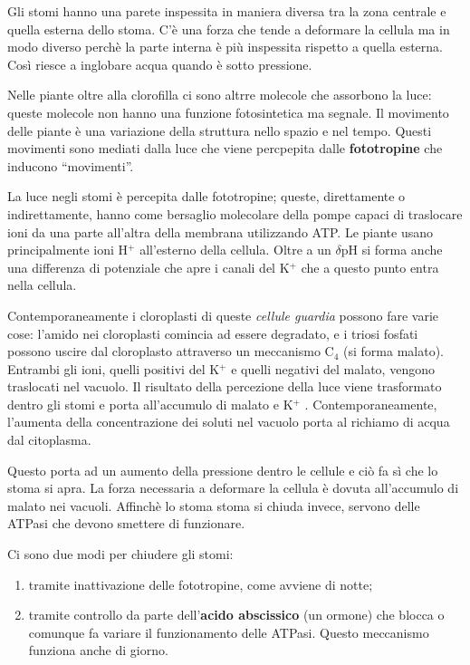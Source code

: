 \documentclass[]{article}
\begin{document}
Gli stomi hanno una parete inspessita in maniera diversa tra la zona
centrale e quella esterna dello stoma. C'è una forza che tende a
deformare la cellula ma in modo diverso perchè la parte interna è più
inspessita rispetto a quella esterna. Così riesce a inglobare acqua
quando è sotto pressione.

Nelle piante oltre alla clorofilla ci sono altrre molecole che assorbono
la luce: queste molecole non hanno una funzione fotosintetica ma
segnale. Il movimento delle piante è una variazione della struttura
nello spazio e nel tempo. Questi movimenti sono mediati dalla luce che
viene percpepita dalle \textbf{fototropine} che inducono ``movimenti''.

La luce negli stomi è percepita dalle fototropine; queste, direttamente
o indirettamente, hanno come bersaglio molecolare della pompe capaci di
traslocare ioni da una parte all'altra della membrana utilizzando ATP.
Le piante usano principalmente ioni H$^+$ all'esterno della cellula.
Oltre a un $\delta$pH si forma anche una differenza di potenziale che
apre i canali del K$^+$ che a questo punto entra nella cellula.

Contemporaneamente i cloroplasti di queste \emph{cellule guardia}
possono fare varie cose: l'amido nei cloroplasti comincia ad essere
degradato, e i triosi fosfati possono uscire dal cloroplasto attraverso
un meccanismo C$_4$ (si forma malato). Entrambi gli ioni, quelli
positivi del K$^+$ e quelli negativi del malato, vengono traslocati nel
vacuolo. Il risultato della percezione della luce viene trasformato
dentro gli stomi e porta all'accumulo di malato e K$^+$ .
Contemporaneamente, l'aumenta della concentrazione dei soluti nel
vacuolo porta al richiamo di acqua dal citoplasma.

Questo porta ad un aumento della pressione dentro le cellule e ciò fa sì
che lo stoma si apra. La forza necessaria a deformare la cellula è
dovuta all'accumulo di malato nei vacuoli. Affinchè lo stoma stoma si
chiuda invece, servono delle ATPasi che devono smettere di funzionare.

Ci sono due modi per chiudere gli stomi:

\begin{enumerate}
\def\labelenumi{\arabic{enumi}.}
\itemsep1pt\parskip0pt
\item
  tramite inattivazione delle fototropine, come avviene di notte;
\item
  tramite controllo da parte dell'\textbf{acido abscissico} (un ormone)
  che blocca o comunque fa variare il funzionamento delle ATPasi. Questo
  meccanismo funziona anche di giorno.
\end{enumerate}
\end{document}
